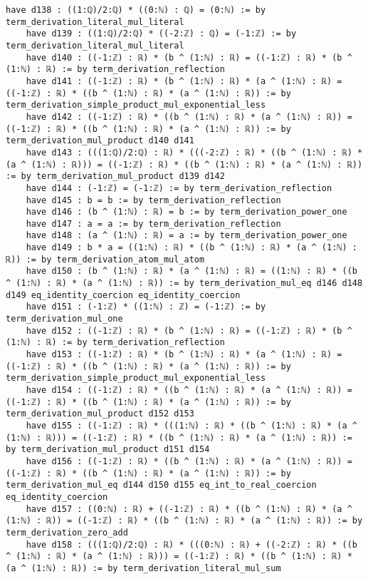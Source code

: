 \documentclass{article}
\begin{document}
\begin{tcolorbox}[colback=white!10, width=\linewidth]
\begin{lstlisting}[language=Lean4]
    have d138 : ((1:ℚ)/2:ℚ) * ((0:ℕ) : ℚ) = (0:ℕ) := by term_derivation_literal_mul_literal
    have d139 : ((1:ℚ)/2:ℚ) * ((-2:ℤ) : ℚ) = (-1:ℤ) := by term_derivation_literal_mul_literal
    have d140 : ((-1:ℤ) : ℝ) * (b ^ (1:ℕ) : ℝ) = ((-1:ℤ) : ℝ) * (b ^ (1:ℕ) : ℝ) := by term_derivation_reflection
    have d141 : ((-1:ℤ) : ℝ) * (b ^ (1:ℕ) : ℝ) * (a ^ (1:ℕ) : ℝ) = ((-1:ℤ) : ℝ) * ((b ^ (1:ℕ) : ℝ) * (a ^ (1:ℕ) : ℝ)) := by term_derivation_simple_product_mul_exponential_less
    have d142 : ((-1:ℤ) : ℝ) * ((b ^ (1:ℕ) : ℝ) * (a ^ (1:ℕ) : ℝ)) = ((-1:ℤ) : ℝ) * ((b ^ (1:ℕ) : ℝ) * (a ^ (1:ℕ) : ℝ)) := by term_derivation_mul_product d140 d141
    have d143 : (((1:ℚ)/2:ℚ) : ℝ) * (((-2:ℤ) : ℝ) * ((b ^ (1:ℕ) : ℝ) * (a ^ (1:ℕ) : ℝ))) = ((-1:ℤ) : ℝ) * ((b ^ (1:ℕ) : ℝ) * (a ^ (1:ℕ) : ℝ)) := by term_derivation_mul_product d139 d142
    have d144 : (-1:ℤ) = (-1:ℤ) := by term_derivation_reflection
    have d145 : b = b := by term_derivation_reflection
    have d146 : (b ^ (1:ℕ) : ℝ) = b := by term_derivation_power_one
    have d147 : a = a := by term_derivation_reflection
    have d148 : (a ^ (1:ℕ) : ℝ) = a := by term_derivation_power_one
    have d149 : b * a = ((1:ℕ) : ℝ) * ((b ^ (1:ℕ) : ℝ) * (a ^ (1:ℕ) : ℝ)) := by term_derivation_atom_mul_atom
    have d150 : (b ^ (1:ℕ) : ℝ) * (a ^ (1:ℕ) : ℝ) = ((1:ℕ) : ℝ) * ((b ^ (1:ℕ) : ℝ) * (a ^ (1:ℕ) : ℝ)) := by term_derivation_mul_eq d146 d148 d149 eq_identity_coercion eq_identity_coercion
    have d151 : (-1:ℤ) * ((1:ℕ) : ℤ) = (-1:ℤ) := by term_derivation_mul_one
    have d152 : ((-1:ℤ) : ℝ) * (b ^ (1:ℕ) : ℝ) = ((-1:ℤ) : ℝ) * (b ^ (1:ℕ) : ℝ) := by term_derivation_reflection
    have d153 : ((-1:ℤ) : ℝ) * (b ^ (1:ℕ) : ℝ) * (a ^ (1:ℕ) : ℝ) = ((-1:ℤ) : ℝ) * ((b ^ (1:ℕ) : ℝ) * (a ^ (1:ℕ) : ℝ)) := by term_derivation_simple_product_mul_exponential_less
    have d154 : ((-1:ℤ) : ℝ) * ((b ^ (1:ℕ) : ℝ) * (a ^ (1:ℕ) : ℝ)) = ((-1:ℤ) : ℝ) * ((b ^ (1:ℕ) : ℝ) * (a ^ (1:ℕ) : ℝ)) := by term_derivation_mul_product d152 d153
    have d155 : ((-1:ℤ) : ℝ) * (((1:ℕ) : ℝ) * ((b ^ (1:ℕ) : ℝ) * (a ^ (1:ℕ) : ℝ))) = ((-1:ℤ) : ℝ) * ((b ^ (1:ℕ) : ℝ) * (a ^ (1:ℕ) : ℝ)) := by term_derivation_mul_product d151 d154
    have d156 : ((-1:ℤ) : ℝ) * ((b ^ (1:ℕ) : ℝ) * (a ^ (1:ℕ) : ℝ)) = ((-1:ℤ) : ℝ) * ((b ^ (1:ℕ) : ℝ) * (a ^ (1:ℕ) : ℝ)) := by term_derivation_mul_eq d144 d150 d155 eq_int_to_real_coercion eq_identity_coercion
    have d157 : ((0:ℕ) : ℝ) + ((-1:ℤ) : ℝ) * ((b ^ (1:ℕ) : ℝ) * (a ^ (1:ℕ) : ℝ)) = ((-1:ℤ) : ℝ) * ((b ^ (1:ℕ) : ℝ) * (a ^ (1:ℕ) : ℝ)) := by term_derivation_zero_add
    have d158 : (((1:ℚ)/2:ℚ) : ℝ) * (((0:ℕ) : ℝ) + ((-2:ℤ) : ℝ) * ((b ^ (1:ℕ) : ℝ) * (a ^ (1:ℕ) : ℝ))) = ((-1:ℤ) : ℝ) * ((b ^ (1:ℕ) : ℝ) * (a ^ (1:ℕ) : ℝ)) := by term_derivation_literal_mul_sum

\end{lstlisting}
\end{tcolorbox}
\end{document}
